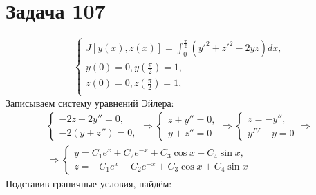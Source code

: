 \documentclass[11pt]{article}
\begin{document}
\section{Задача 107}
\label{sec:orgfa62bf7}
\begin{equation*}
\begin{cases}
J[y(x), z(x)] = \int_0^{\frac{\pi}2}(y'^2 + z'^2 - 2yz)dx, \\
y(0) = 0, y\left(\frac{\pi}2\right) = 1, \\
z(0) = 0, z\left(\frac{\pi}2\right) = 1, \\
\end{cases}
\end{equation*}
Записываем систему уравнений Эйлера:
\begin{multline*}
\begin{cases}
-2z - 2y'' = 0, \\
-2(y + z'') = 0,
\end{cases}
\Rightarrow
\begin{cases}
z + y'' = 0, \\
y + z'' = 0
\end{cases}
\Rightarrow
\begin{cases}
z = -y'', \\
y^{IV} - y = 0
\end{cases}
\Rightarrow \\
\Rightarrow
\begin{cases}
y = C_1e^x + C_2e^{-x} + C_3\cos x + C_4\sin x, \\
z = -C_1e^x - C_2e^{-x} + C_3\cos x + C_4\sin x
\end{cases}
\end{multline*}
Подставив граничные условия, найдём:
\end{document}
